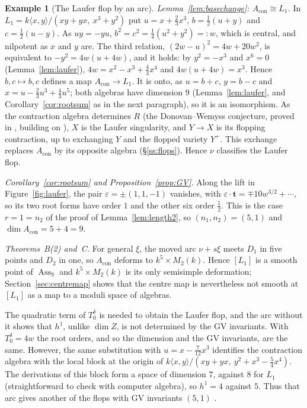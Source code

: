 \documentclass[11pt]{amsart}
\numberwithin{table}{section}
\numberwithin{figure}{section}
\numberwithin{equation}{section}
\theoremstyle{definition}
\newtheorem{ex}[thm]{Example}
\theoremstyle{plain}
\newcommand{\Acon}{A_{\mathrm{con}}}
\DeclareMathOperator{\Ass}{Ass}
\begin{document}
\begin{ex}[The Laufer flop by an arc]
\emph{Lemma~\ref{lem:basechange}: $\Acon \cong L_1$.} In $L_1 = k\langle x,y\rangle/(xy + yx,\ x^3 + y^2)$ put $u = x + \frac23 x^3$, $b = \frac12(u + y)$ and $c = \frac12(u - y)$. As $uy = -yu$, $b^2 = c^2 = \frac14(u^2 + y^2) =: w$, which is central, and nilpotent as $x$ and $y$ are. The third relation, $(2w - u)^2 = 4w + 20w^2$, is equivalent to $-y^2 = 4w(u + 4w)$, and it holds: by $y^2 = -x^3$ and $x^6 = 0$ (Lemma~\ref{lem:laufer}), $4w = x^2 - x^3 + \frac43 x^4$ and $4w(u + 4w) = x^3$. Hence $b, c \mapsto b, c$ defines a map $\Acon \to L_1$. It is onto, as $u = b + c$, $y = b - c$ and $x = u - \frac23 u^3 + \frac43 u^5$; both algebras have dimension $9$ (Lemma~\ref{lem:laufer}, and Corollary~\ref{cor:rootsum} as in the next paragraph), so it is an isomorphism. As the contraction algebra determines $R$ (the Donovan--Wemyss conjecture, proved in \cite{JKM,KLW}, building on \cite{HK}), $X$ is the Laufer singularity, and $Y \to X$ is its flopping contraction, up to exchanging $Y$ and the flopped variety $Y^+$. This exchange replaces $\Acon$ by its opposite algebra (\S\ref{ss:flops}). Hence $\nu$ classifies the Laufer flop.

\emph{Corollary~\ref{cor:rootsum} and Proposition~\ref{prop:GV}.} Along the lift in Figure~\ref{fig:laufer}, the pair $\varepsilon = \pm(1, 1, -1)$ vanishes, with $\varepsilon\cdot\mathbf t = \mp 10w^{3/2} + \cdots$, so its two root forms have order $1$ and the other six order $\frac12$. This is the case $r = 1 = n_2$ of the proof of Lemma~\ref{lem:length2}, so $(n_1, n_2) = (5, 1)$ and $\dim \Acon = 5 + 4 = 9$.

\emph{Theorems~B(2) and~C.} For general $\xi$, the moved arc $\nu + s\xi$ meets $D_1$ in five points and $D_2$ in one, so $\Acon$ deforms to $k^5 \times M_2(k)$. Hence $[L_1]$ is a smooth point of $\Ass_9$ and $k^5 \times M_2(k)$ is its only semisimple deformation; Section~\ref{sec:centremap} shows that the centre map is nevertheless not smooth at $[L_1]$ as a map to a moduli space of algebras.

The quadratic term of $T_0^\delta$ is needed to obtain the Laufer flop, and the arc without it shows that $h^1$, unlike $\dim Z$, is not determined by the GV invariants. With $T_0^\delta = 4w$ the root orders, and so the dimension and the GV invariants, are the same. However, the same substitution with $u = x - \frac7{12}x^3$ identifies the contraction algebra with the local block at the origin of $k\langle x,y\rangle/(xy + yx,\ y^2 + x^3 - \frac54 x^4)$. The derivations of this block form a space of dimension $7$, against $8$ for $L_1$ (straightforward to check with computer algebra), so $h^1 = 4$ against $5$. Thus that arc gives another of the flops with GV invariants $(5, 1)$ \cite[Cor~8.13]{BW}.
\end{ex}
\end{document}
